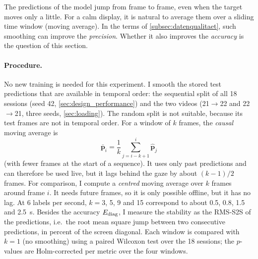 The predictions of the model jump from frame to frame, even when the target
moves only a little. For a calm display, it is natural to average them over a
sliding time window (moving average). In the terms of
\cref{subsec:datenqualitaet}, such smoothing can improve the \emph{precision}.
Whether it also improves the \emph{accuracy} is the question of this section.

\paragraph{Procedure.} No new training is needed for this experiment. I smooth
the stored test predictions that are available in temporal order: the
sequential split of all 18 sessions (seed 42, \cref{sec:design_performance}) and
the two videos (21$\to$22 and 22$\to$21, three seeds, \cref{sec:loading}). The
random split is not suitable, because its test frames are not in temporal
order. For a window of $k$ frames, the \emph{causal} moving average is
\begin{equation}
  \bar{\bm p}_i = \frac{1}{k}\sum_{j=i-k+1}^{i}\hat{\bm p}_j
  \label{eq:ma}
\end{equation}
(with fewer frames at the start of a sequence). It uses only past predictions
and can therefore be used live, but it lags behind the gaze by about $(k-1)/2$
frames. For comparison, I compute a \emph{centred} moving average over $k$
frames around frame $i$. It needs future frames, so it is only possible
offline, but it has no lag. At 6 labels per second, $k=3$, 5, 9 and 15
correspond to about \SI{0.5}{}, \SI{0.8}{}, \SI{1.5}{} and \SI{2.5}{\second}.
Besides the accuracy $E_{\mathrm{diag}}$, I measure the stability as the RMS-S2S of the
predictions, i.e.\ the root mean square jump between two consecutive
predictions, in percent of the screen diagonal. Each window is compared with
$k=1$ (no smoothing) using a paired Wilcoxon test over the 18 sessions; the
$p$-values are Holm-corrected per metric over the four windows.

